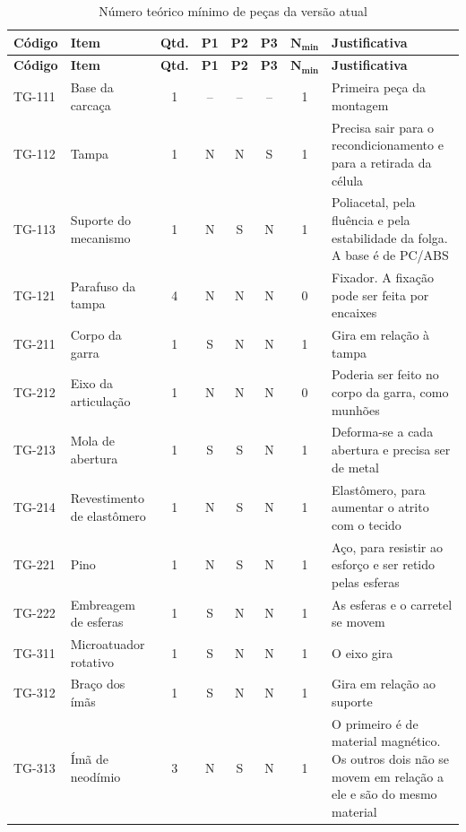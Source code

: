 \begingroup
\footnotesize
\renewcommand{\arraystretch}{1.25}
\begin{longtable}{@{}l >{\RaggedRight\arraybackslash}p{3.0cm} c c c c c >{\RaggedRight\arraybackslash}p{5.6cm}@{}}
    \caption{Número teórico mínimo de peças da versão atual}\label{tab:dfma_minimo}\\
    \toprule
    \textbf{Código} & \textbf{Item} & \textbf{Qtd.} & \textbf{P1} & \textbf{P2} & \textbf{P3} & $\boldsymbol{N_{\min}}$ & \textbf{Justificativa} \\
    \midrule
    \endfirsthead
    \toprule
    \textbf{Código} & \textbf{Item} & \textbf{Qtd.} & \textbf{P1} & \textbf{P2} & \textbf{P3} & $\boldsymbol{N_{\min}}$ & \textbf{Justificativa} \\
    \midrule
    \endhead
    \bottomrule
    \endfoot
    TG-111 & Base da carcaça & 1 & -- & -- & -- & 1 & Primeira peça da montagem \\
    TG-112 & Tampa & 1 & N & N & S & 1 & Precisa sair para o recondicionamento e para a retirada da célula \\
    TG-113 & Suporte do mecanismo & 1 & N & S & N & 1 & Poliacetal, pela fluência e pela estabilidade da folga. A base é de PC/ABS \\
    TG-121 & Parafuso da tampa & 4 & N & N & N & 0 & Fixador. A fixação pode ser feita por encaixes \\
    \midrule
    TG-211 & Corpo da garra & 1 & S & N & N & 1 & Gira em relação à tampa \\
    TG-212 & Eixo da articulação & 1 & N & N & N & 0 & Poderia ser feito no corpo da garra, como munhões \\
    TG-213 & Mola de abertura & 1 & S & S & N & 1 & Deforma-se a cada abertura e precisa ser de metal \\
    TG-214 & Revestimento de elastômero & 1 & N & S & N & 1 & Elastômero, para aumentar o atrito com o tecido \\
    TG-221 & Pino & 1 & N & S & N & 1 & Aço, para resistir ao esforço e ser retido pelas esferas \\
    TG-222 & Embreagem de esferas & 1 & S & N & N & 1 & As esferas e o carretel se movem \\
    \midrule
    TG-311 & Microatuador rotativo & 1 & S & N & N & 1 & O eixo gira \\
    TG-312 & Braço dos ímãs & 1 & S & N & N & 1 & Gira em relação ao suporte \\
    TG-313 & Ímã de neodímio & 3 & N & S & N & 1 & O primeiro é de material magnético. Os outros dois não se movem em relação a ele e são do mesmo material \\

\end{longtable}
